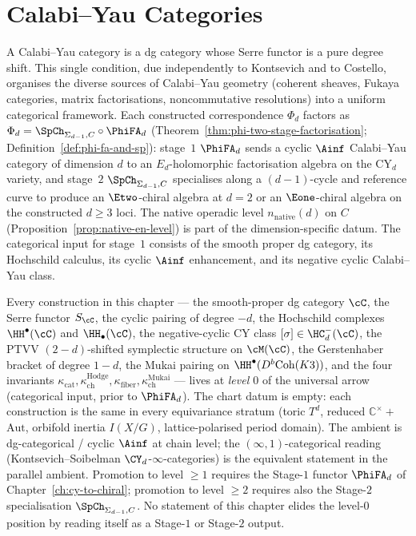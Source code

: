 \chapter{Calabi--Yau Categories}
\label{ch:cy-categories}

A Calabi--Yau category is a dg category whose Serre functor is a pure degree shift. This single condition, due independently to Kontsevich and to Costello, organises the diverse sources of Calabi--Yau geometry (coherent sheaves, Fukaya categories, matrix factorisations, noncommutative resolutions) into a uniform categorical framework. Each constructed correspondence $\Phi_d$ factors as $\Phi_d = \SpCh_{\Sigma_{d-1},C} \circ \PhiFA_d$ (Theorem~\ref{thm:phi-two-stage-factorisation}; Definition~\ref{def:phi-fa-and-sp}): stage~$1$ $\PhiFA_d$ sends a cyclic $\Ainf$ Calabi--Yau category of dimension $d$ to an $E_d$-holomorphic factorisation algebra on the CY$_d$ variety, and stage~$2$ $\SpCh_{\Sigma_{d-1},C}$ specialises along a $(d-1)$-cycle and reference curve to produce an $\Etwo$-chiral algebra at $d = 2$ or an $\Eone$-chiral algebra on the constructed $d \geq 3$ loci. The native operadic level $n_{\mathrm{native}}(d)$ on $C$ (Proposition~\ref{prop:native-en-level}) is part of the dimension-specific datum. The categorical input for stage~$1$ consists of the smooth proper dg category, its Hochschild calculus, its cyclic $\Ainf$ enhancement, and its negative cyclic Calabi--Yau class.

\begin{remark}
\label{rem:cy-cat-three-axis-scope}
Every construction in this chapter — the smooth-proper dg category $\cC$, the Serre functor $S_\cC$, the cyclic pairing of degree $-d$, the Hochschild complexes $\HH^\bullet(\cC)$ and $\HH_\bullet(\cC)$, the negative-cyclic CY class $[\sigma] \in \HC^-_d(\cC)$, the PTVV $(2-d)$-shifted symplectic structure on $\cM(\cC)$, the Gerstenhaber bracket of degree $1-d$, the Mukai pairing on $\HH^\bullet(D^b\mathrm{Coh}(K3))$, and the four invariants $\kappa_{\mathrm{cat}}, \kappa_{\mathrm{ch}}^{\mathrm{Hodge}}, \kappa_{\mathrm{fiber}}, \kappa_{\mathrm{ch}}^{\mathrm{Mukai}}$ — lives at \emph{level $0$} of the universal arrow (categorical input, prior to $\PhiFA_d$). The chart datum is empty: each construction is the same in every equivariance stratum (toric $T^d$, reduced $\mathbb C^\times +$ $\mathrm{Aut}$, orbifold inertia $I(X/G)$, lattice-polarised period domain). The ambient is dg-categorical / cyclic $\Ainf$ at chain level; the $(\infty,1)$-categorical reading (Kontsevich--Soibelman $\CY_d$-$\infty$-categories) is the equivalent statement in the parallel ambient. Promotion to level $\geq 1$ requires the Stage-$1$ functor $\PhiFA_d$ of Chapter~\ref{ch:cy-to-chiral}; promotion to level $\geq 2$ requires also the Stage-$2$ specialisation $\SpCh_{\Sigma_{d-1}, C}$. No statement of this chapter elides the level-$0$ position by reading itself as a Stage-$1$ or Stage-$2$ output.
\end{remark}

